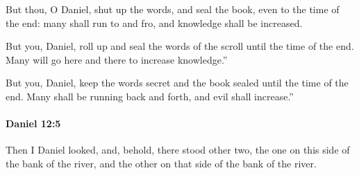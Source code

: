 			\begin{versebox}
					\item[BHS] 
					\item[LXX] 
					\item[ASV] But thou, O Daniel, shut up the words, and seal the book, even to the time of the end: many shall run to and fro, and knowledge shall be increased.
					\item[NIV] But you, Daniel, roll up and seal the words of the scroll until the time of the end. Many will go here and there to increase knowledge.”
					\item[NRSV] But you, Daniel, keep the words secret and the book sealed until the time of the end. Many shall be running back and forth, and evil shall increase.”
			\end{versebox}

		\paragraph{Daniel 12:5} %
			\label{DANIEL-12-5}

			Then I Daniel looked, and, behold, there stood other two, the one on this side of the bank of the river, and the other on that side of the bank of the river.

